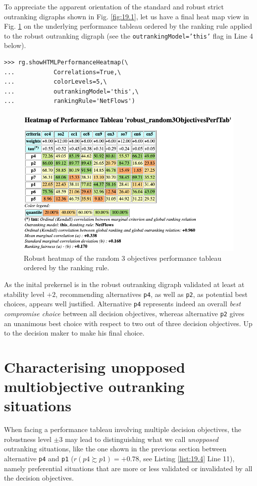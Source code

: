 To appreciate the apparent orientation of the standard and robust strict outranking digraphs shown in Fig. \ref{fig:19.1}, let us have a final heat map view in Fig. \ref{fig:19.2} on the underlying performance tableau ordered by the \NetFlows ranking rule applied to the robust outranking digraph (see the \texttt{outrankingModel='this'} flag in Line 4 below).
\begin{lstlisting}
>>> rg.showHTMLPerformanceHeatmap(\
...           Correlations=True,\
...           colorLevels=5,\
...           outrankingModel='this',\
...           rankingRule='NetFlows')
\end{lstlisting}
\begin{figure}[h]
\includegraphics[width=12cm]{Figures/robustHeatmap.png}
\caption{Robust heatmap of the random 3 objectives performance tableau ordered by the \NetFlows ranking rule.} 
\label{fig:19.2}       %
\end{figure}
 As the inital prekernel is in the robust outranking digraph validated at least at stability level $+2$, recommending alternatives \texttt{p4}, as well as \texttt{p2}, as potential best choices, appears well justified. Alternative \texttt{p4} represents indeed an overall \emph{best compromise choice} between all decision objectives, whereas alternative \texttt{p2} gives an unanimous best choice with respect to two out of three decision objectives. Up to the decision maker to make his final choice.

\section{Characterising unopposed multiobjective outranking situations}
\label{sec:19.5}

When facing a performance tableau involving multiple decision objectives, the robustness level $\pm 3$  may lead to distinguishing what we call \emph{unopposed} outranking situations, like the one shown in the previous section between alternative \texttt{p4} and \texttt{p1} ($r(p4 \succsim p1) = +0.78$, see Listing \ref{list:19.4} Line 11), namely preferential situations that are more or less validated or invalidated by all the decision objectives.  

